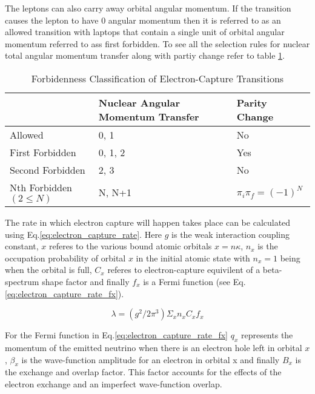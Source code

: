 \documentclass[jon_ringuette_thesis.tex]{subfiles}
\begin{document}
    The leptons can also carry away orbital angular momentum. If the transition causes the lepton to have 0 angular momentum then it is referred to as an allowed transition with laptops that contain a single unit of orbital angular momentum referred to ass first forbidden. To see all the selection rules for nuclear total angular momentum transfer along with partiy change refer to table \ref{tab:forbiddenness_classification}.
    \begin{table}
        \centering
        \caption{Forbidenness Classification of Electron-Capture Transitions}
        \label{tab:forbiddenness_classification}
        \begin{tabular}{|l|l|l|}
            \hline
            & Nuclear Angular Momentum Transfer & Parity Change          \\
            \hline
            Allowed                   & 0, 1                              & No                     \\
            \hline
            First Forbidden           & 0, 1, 2                           & Yes                    \\
            \hline
            Second Forbidden          & 2, 3                              & No                     \\
            \hline
            Nth Forbidden $(2 \le N)$ & N, N+1                            & $\pi_i \pi_f = (-1)^N$ \\
            \hline
        \end{tabular}
    \end{table}


    The rate in which electron capture will happen takes place can be calculated using Eq.\ref{eq:electron_capture_rate}. Here $g$ is the weak interaction coupling constant, $x$ referes to the various bound atomic orbitals $x=n\kappa$, $n_x$ is the occupation probability of orbital $x$ in the initial atomic state with $n_x = 1$ being when the orbital is full, $C_x$ referes to electron-capture equivilent of a beta-spectrum shape factor and finally $f_x$ is a Fermi function (see Eq.\ref{eq:electron_capture_rate_fx}).

    \begin{equation}
        \lambda = (g^2/2\pi^3) \Sigma_x n_x C_x f_x
        \label{eq:electron_capture_rate}
    \end{equation}

    For the Fermi function in Eq.\ref{eq:electron_capture_rate_fx} $q_x$ represents the momentum of the emitted neutrino when there is an electron hole left in orbital $x$, $\beta_x$ is the wave-function amplitude for an electron in orbital x and finally $B_x$ is the exchange and overlap factor. This factor accounts for the effects of the electron exchange and an imperfect wave-function overlap. \cite{crasemann}
\end{document}
